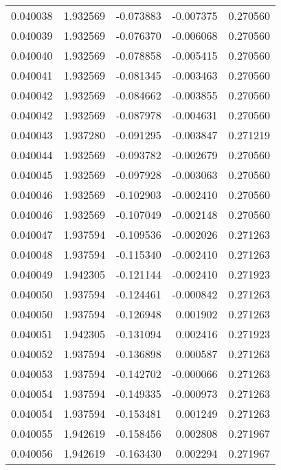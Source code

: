 \begin{tabular}{lrrrr}
0.040038    &  1.932569 & -0.073883 & -0.007375 &             0.270560 \\
0.040039    &  1.932569 & -0.076370 & -0.006068 &             0.270560 \\
0.040040    &  1.932569 & -0.078858 & -0.005415 &             0.270560 \\
0.040041    &  1.932569 & -0.081345 & -0.003463 &             0.270560 \\
0.040042    &  1.932569 & -0.084662 & -0.003855 &             0.270560 \\
0.040042    &  1.932569 & -0.087978 & -0.004631 &             0.270560 \\
0.040043    &  1.937280 & -0.091295 & -0.003847 &             0.271219 \\
0.040044    &  1.932569 & -0.093782 & -0.002679 &             0.270560 \\
0.040045    &  1.932569 & -0.097928 & -0.003063 &             0.270560 \\
0.040046    &  1.932569 & -0.102903 & -0.002410 &             0.270560 \\
0.040046    &  1.932569 & -0.107049 & -0.002148 &             0.270560 \\
0.040047    &  1.937594 & -0.109536 & -0.002026 &             0.271263 \\
0.040048    &  1.937594 & -0.115340 & -0.002410 &             0.271263 \\
0.040049    &  1.942305 & -0.121144 & -0.002410 &             0.271923 \\
0.040050    &  1.937594 & -0.124461 & -0.000842 &             0.271263 \\
0.040050    &  1.937594 & -0.126948 &  0.001902 &             0.271263 \\
0.040051    &  1.942305 & -0.131094 &  0.002416 &             0.271923 \\
0.040052    &  1.937594 & -0.136898 &  0.000587 &             0.271263 \\
0.040053    &  1.937594 & -0.142702 & -0.000066 &             0.271263 \\
0.040054    &  1.937594 & -0.149335 & -0.000973 &             0.271263 \\
0.040054    &  1.937594 & -0.153481 &  0.001249 &             0.271263 \\
0.040055    &  1.942619 & -0.158456 &  0.002808 &             0.271967 \\
0.040056    &  1.942619 & -0.163430 &  0.002294 &             0.271967 \\

\end{tabular}
